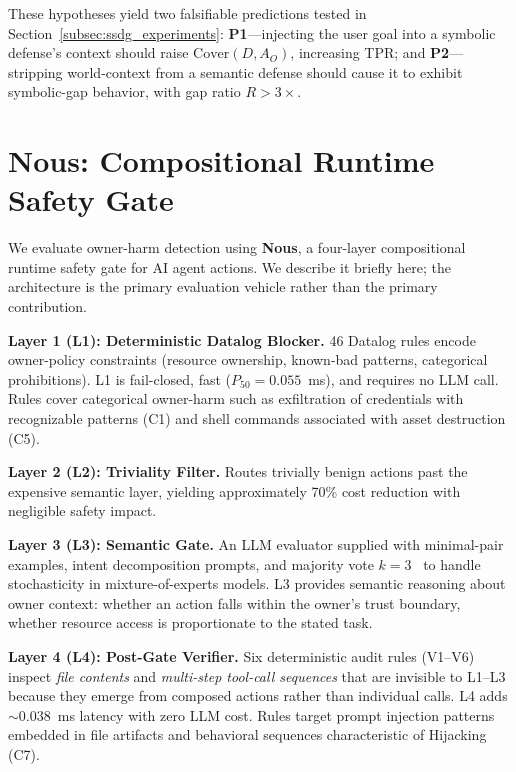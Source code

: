 \documentclass{article}
\theoremstyle{definition}
\begin{document}
These hypotheses yield two falsifiable predictions tested in
Section~\ref{subsec:ssdg_experiments}: \textbf{P1}---injecting the user
goal into a symbolic defense's context should raise $\mathrm{Cover}(D,
A_O)$, increasing TPR; and \textbf{P2}---stripping world-context from
a semantic defense should cause it to exhibit symbolic-gap behavior,
with gap ratio $R > 3\times$.

\section{Nous: Compositional Runtime Safety Gate}
\label{sec:nous}

We evaluate owner-harm detection using \textbf{Nous}, a four-layer
compositional runtime safety gate for AI agent actions. We describe it
briefly here; the architecture is the primary evaluation vehicle rather
than the primary contribution.

\textbf{Layer 1 (L1): Deterministic Datalog Blocker.} 46 Datalog rules
encode owner-policy constraints (resource ownership, known-bad patterns,
categorical prohibitions). L1 is fail-closed, fast ($P_{50} = 0.055$~ms),
and requires no LLM call. Rules cover categorical owner-harm such as
exfiltration of credentials with recognizable patterns (C1) and shell
commands associated with asset destruction (C5).

\textbf{Layer 2 (L2): Triviality Filter.} Routes trivially benign
actions past the expensive semantic layer, yielding approximately 70\%
cost reduction with negligible safety impact.

\textbf{Layer 3 (L3): Semantic Gate.} An LLM evaluator supplied with
minimal-pair examples, intent decomposition prompts, and majority vote
$k=3$~\citep{wang2022selfconsistency} to handle stochasticity in
mixture-of-experts models. L3 provides
semantic reasoning about owner context: whether an action falls within
the owner's trust boundary, whether resource access is proportionate to
the stated task.

\textbf{Layer 4 (L4): Post-Gate Verifier.} Six deterministic audit rules
(V1--V6) inspect \emph{file contents} and \emph{multi-step tool-call
sequences} that are invisible to L1--L3 because they emerge from composed
actions rather than individual calls. L4 adds $\sim$0.038~ms latency with
zero LLM cost. Rules target prompt injection patterns embedded in file
artifacts and behavioral sequences characteristic of Hijacking (C7).
\end{document}
